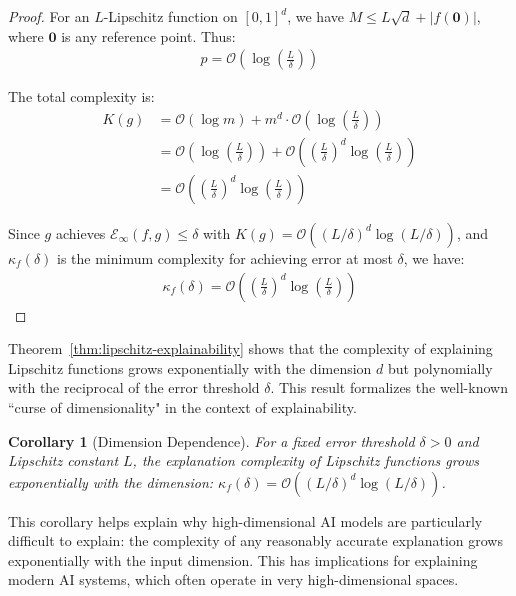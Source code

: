 \documentclass[11pt,letter,leqno]{article}
\newtheorem{corollary}[theorem]{Corollary}
\begin{document}
\begin{proof}
For an $L$-Lipschitz function on $[0,1]^d$, we have $M \leq L\sqrt{d} + |f(\mathbf{0})|$, where $\mathbf{0}$ is any reference point. Thus:
\begin{align}
p = \mathcal{O}\left(\log\left(\frac{L}{\delta}\right)\right)
\end{align}

The total complexity is:
\begin{align}
K(g) &= \mathcal{O}(\log m) + m^d \cdot \mathcal{O}\left(\log\left(\frac{L}{\delta}\right)\right)\\
&= \mathcal{O}\left(\log\left(\frac{L}{\delta}\right)\right) + \mathcal{O}\left(\left(\frac{L}{\delta}\right)^d \log\left(\frac{L}{\delta}\right)\right)\\
&= \mathcal{O}\left(\left(\frac{L}{\delta}\right)^d \log\left(\frac{L}{\delta}\right)\right)
\end{align}

Since $g$ achieves $\mathcal{E}_{\infty}(f, g) \leq \delta$ with $K(g) = \mathcal{O}((L/\delta)^d \log(L/\delta))$, and $\kappa_f(\delta)$ is the minimum complexity for achieving error at most $\delta$, we have:
\begin{align}
\kappa_f(\delta) = \mathcal{O}\left(\left(\frac{L}{\delta}\right)^d \log\left(\frac{L}{\delta}\right)\right)
\end{align}
\end{proof}

Theorem~\ref{thm:lipschitz-explainability} shows that the complexity of explaining Lipschitz functions grows exponentially with the dimension $d$ but polynomially with the reciprocal of the error threshold $\delta$.  This result formalizes the well-known ``curse of dimensionality" in the context of explainability.

\begin{corollary}[Dimension Dependence]
\label{cor:dimension-dependence}
For a fixed error threshold $\delta > 0$ and Lipschitz constant $L$, the explanation complexity of Lipschitz functions grows exponentially with the dimension: $\kappa_f(\delta) = \mathcal{O}((L/\delta)^d \log(L/\delta))$.
\end{corollary}

This corollary helps explain why high-dimensional AI models are particularly difficult to explain: the complexity of any reasonably accurate explanation grows exponentially with the input dimension.  This has implications for explaining modern AI systems, which often operate in very high-dimensional spaces.
\end{document}
